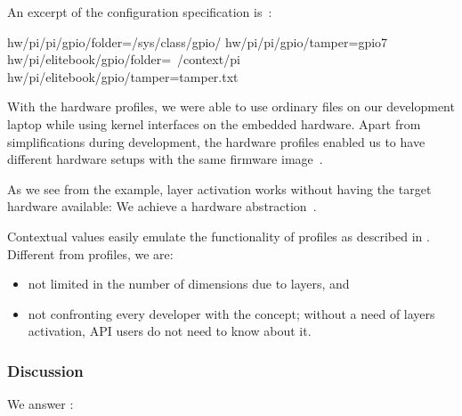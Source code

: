 \begin{example}
An excerpt of the configuration specification is~\cite{raab2015global}:

hw/pi/pi/gpio/folder=/sys/class/gpio/
hw/pi/pi/gpio/tamper=gpio7
hw/pi/elitebook/gpio/folder=~/context/pi
hw/pi/elitebook/gpio/tamper=tamper.txt
\end{code}

With the hardware profiles, we were able to use ordinary files on our development laptop while using kernel interfaces on the embedded hardware.
Apart from simplifications during development, the hardware profiles enabled us to have different hardware setups with the same firmware image~\cite{raab2015global}.
\end{example}

As we see from the example, layer activation works without having the target hardware available:
We achieve a hardware abstraction~\cite{raab2015global}.

Contextual values easily emulate the functionality of profiles as described in .
Different from profiles, we are:
\begin{itemize}
\item not limited in the number of dimensions due to layers, and
\item not confronting every developer with the concept; without a need of layers activation, API users do not need to know about it.
\end{itemize}


\subsubsection{Discussion}

We answer :
\rqImplicationEmbedded*

